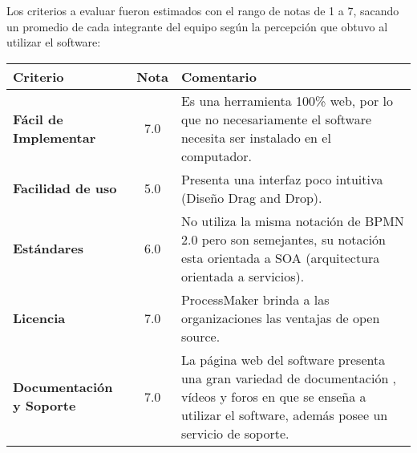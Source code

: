 Los criterios a evaluar fueron estimados con el rango de notas de 1 a 7, sacando un promedio de cada integrante del equipo según la percepción que obtuvo al utilizar el software: \\

\begin{center}
\begin{tabular}{|l|c|p{2.40in}|}
 \hline
 \textbf{Criterio} & \textbf{Nota} & \textbf{Comentario} \\
 \hline
 \textbf{Fácil de Implementar} & 7.0 & Es una herramienta 100\% web, por lo que no necesariamente el software necesita ser instalado en el computador. \\
 \hline
 \textbf{Facilidad de uso} & 5.0 & Presenta una interfaz poco intuitiva (Diseño Drag and Drop). \\
 \hline
 \textbf{Estándares} & 6.0 & No utiliza la misma notación de BPMN 2.0 pero son semejantes, su notación esta orientada a SOA (arquitectura orientada a servicios). \\
 \hline
 \textbf{Licencia} & 7.0 & ProcessMaker brinda a las organizaciones las ventajas de open source. \\
 \hline
 \textbf{Documentación y Soporte} & 7.0 & La página web del software presenta una gran variedad de documentación , vídeos y foros en que se enseña a utilizar el software, además posee un servicio de soporte. \\
 \hline
\end{tabular}
\end{center}